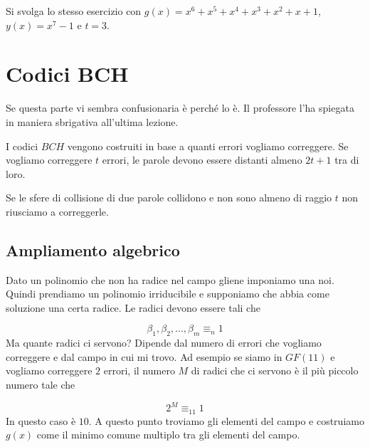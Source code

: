 \documentclass[12pt]{report}
\begin{document}
    \begin{es}
        Si svolga lo stesso esercizio con $g(x) = x^6 + x^5 + x^4 + x^3 + x^2 + x + 1$, $y(x) = x^7 - 1$ e $t = 3$.
    \end{es}

    \section{Codici BCH}
    Se questa parte vi sembra confusionaria è perché lo è. Il professore l'ha spiegata in maniera sbrigativa all'ultima lezione.

    \vspace{10px}

    \noindent
    I codici $BCH$ vengono costruiti in base a quanti errori vogliamo correggere. Se vogliamo correggere $t$ errori, le parole devono essere distanti almeno $2t + 1$ tra di loro.

    \begin{center}
    \end{center}

    \noindent
    Se le sfere di collisione di due parole collidono e non sono almeno di raggio $t$ non riusciamo a correggerle.


    \subsection{Ampliamento algebrico}
    Dato un polinomio che non ha radice nel campo gliene imponiamo una noi. Quindi prendiamo un polinomio irriducibile e supponiamo che abbia come soluzione una certa radice.
    Le radici devono essere tali che

    $$\beta_1,\beta_2,\dots,\beta_m \equiv_n 1$$
    Ma quante radici ci servono? Dipende dal numero di errori che vogliamo correggere e dal campo in cui mi trovo. Ad esempio se siamo in $GF(11)$ e vogliamo correggere $2$ errori, il numero $M$ di radici che ci servono è il più piccolo numero tale che

    $$2^M \equiv_{11} 1$$
    In questo caso è $10$.
    A questo punto troviamo gli elementi del campo e costruiamo $g(x)$ come il minimo comune multiplo tra gli elementi del campo.
\end{document}
